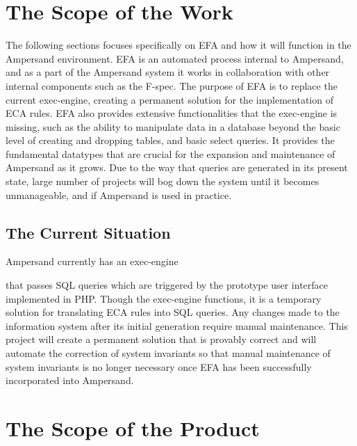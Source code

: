 \documentclass[12pt]{report}
\begin{document}
{\section{The Scope of the Work}\label{sec:ScopeOfWork}
The following sections focuses specifically on EFA and how it will 
function in the Ampersand environment.
EFA is an automated process internal to Ampersand, and as a part of the 
Ampersand system it works in collaboration with other internal components such 
as the F-spec. The purpose of EFA is to replace the current exec-engine,
creating a permanent solution for the implementation of ECA rules. EFA also 
provides extensive functionalities that the exec-engine is missing, such as the 
ability to manipulate data in a database beyond the basic level of creating and 
dropping tables, and basic select queries. It provides the fundamental 
datatypes that are crucial for the expansion and maintenance of Ampersand as it 
grows. Due to the way that queries are generated in its present state, large 
number of projects will bog down the system until it becomes unmanageable, and 
if Ampersand is used in practice.

\subsection{The Current Situation} %

Ampersand currently has an exec-engine 

that passes SQL queries which are 
triggered by the prototype user interface implemented in PHP. Though the 
exec-engine functions, it is a temporary solution for translating ECA rules 
into SQL queries. Any changes made to the information system after its initial 
generation require manual maintenance. This project will create a permanent 
solution that is provably correct and will automate the correction of system 
invariants so that manual maintenance of system invariants is no longer 
necessary once EFA has been successfully incorporated into Ampersand.

\section{The Scope of the Product}\label{sec:ScopeOfProduct}

}
\end{document}
